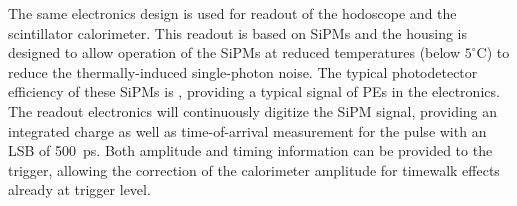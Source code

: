 The same electronics design is used for readout of the hodoscope and
the scintillator calorimeter.  This readout is based on SiPMs and the
housing is designed to allow operation of the SiPMs at reduced
temperatures (below $5^\circ$C) to reduce the thermally-induced
single-photon noise.  The typical photodetector efficiency of these
SiPMs is \draft{[30\%]}\cite{cms:sipm_performance}, providing a typical signal
of \draft{[]} PEs in the electronics.  The readout electronics will
continuously digitize the SiPM signal, providing an integrated charge
as well as time-of-arrival measurement for the pulse with an LSB of
500~ps.  Both amplitude and timing information can be provided to the
trigger, allowing the correction of the calorimeter amplitude for
timewalk effects already at trigger level.



